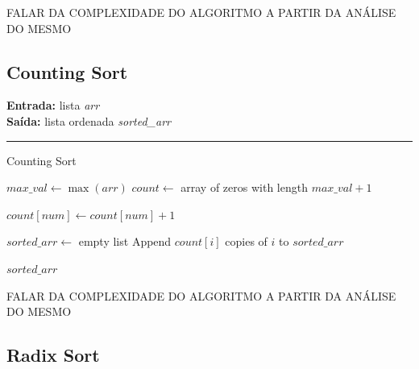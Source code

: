 \documentclass[conference]{IEEEtran}
\begin{document}
FALAR DA COMPLEXIDADE DO ALGORITMO A PARTIR DA ANÁLISE DO MESMO

\subsection{Counting Sort}

\begin{algorithm}[H]
    \raggedright
    \vspace{.1em}
    \textbf{Entrada:} lista \textit{arr} \\
    \textbf{Saída:} lista ordenada \textit{sorted\_arr} \\
    \vspace{.5em}
    \hrule 
    \caption{Counting Sort}
    \begin{algorithmic}[1]
        \State $max\_val \gets \max(arr)$
        \State $count \gets$ array of zeros with length $max\_val + 1$
        
            \State $count[num] \gets count[num] + 1$
        \EndFor
    
        \State $sorted\_arr \gets$ empty list
                \State Append $count[i]$ copies of $i$ to $sorted\_arr$
            \EndIf
        \EndFor
    
        \State \Return $sorted\_arr$
    \end{algorithmic}
\end{algorithm}

FALAR DA COMPLEXIDADE DO ALGORITMO A PARTIR DA ANÁLISE DO MESMO

\subsection{Radix Sort}
\end{document}
